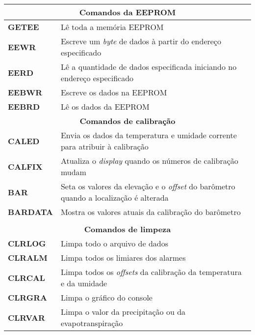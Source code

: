 \begin{anexosenv}
\begin{center}
\begin{longtable}{ll}
\multicolumn{2}{c}{\cellcolor{gray!25}\textbf{Comandos da EEPROM}}                                     		 \\ \hline
\textbf{GETEE}                 & Lê toda a memória EEPROM \\ \hline
\textbf{EEWR}                   & Escreve um \textit{byte} de dados à partir do endereço especificado                                   \\ \hline
\textbf{EERD}                   & Lê a quantidade de dados especificada iniciando no endereço especificado                                   \\ \hline
\textbf{EEBWR}                   & Escreve os dados na EEPROM                                    \\ \hline
\textbf{EEBRD}                   & Lê os dados da EEPROM \\ \hline
\multicolumn{2}{c}{\cellcolor{gray!25}\textbf{Comandos de calibração}}                                     		 \\ \hline
\textbf{CALED}                 & Envia os dados da temperatura e umidade corrente para atribuir à calibração \\ \hline
\textbf{CALFIX}                   & Atualiza o \textit{display} quando os números de calibração mudam\\ \hline
\textbf{BAR}                   & Seta os valores da elevação e o \textit{offset} do barômetro quando a localização é alterada                                   \\ \hline
\textbf{BARDATA}                   & Mostra os valores atuais da calibração do barômetro                                   \\ \hline \\
\multicolumn{2}{c}{\cellcolor{gray!25}\textbf{Comandos de limpeza}}                                     		 \\ \hline
\textbf{CLRLOG}                 & Limpa todo o arquivo de dados                                                       \\ \hline
\textbf{CLRALM}                   & Limpa todos os limiares dos alarmes                                   \\ \hline
\textbf{CLRCAL}                   & Limpa todos os \textit{offsets} da calibração da temperatura e da umidade \\ \hline
\textbf{CLRGRA}                   & Limpa o gráfico do console \\ \hline
\textbf{CLRVAR}                   & Limpa o valor da precipitação ou da evapotranspiração \\ \hline

\end{longtable}
\end{center}
\end{anexosenv}
